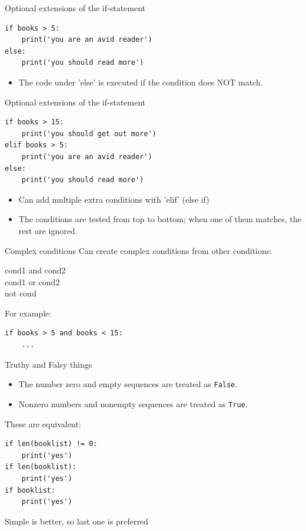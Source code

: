 \documentclass[aspectratio=169,usenames,dvipsnames]{beamer}
\begin{document}
\begin{frame}[fragile]{Optional extensions of the if-statement}
\begin{lstlisting}
if books > 5:
    print('you are an avid reader')
else:
    print('you should read more')
\end{lstlisting}

\begin{itemize}
    \item The code under 'else' is executed if the condition does NOT match.
\end{itemize}
\end{frame}


\begin{frame}[fragile]{Optional extensions of the if-statement}
\begin{lstlisting}
if books > 15:
    print('you should get out more')
elif books > 5:
    print('you are an avid reader')
else:
    print('you should read more')
\end{lstlisting}

\begin{itemize}
    \item Can add multiple extra conditions with 'elif' (else if)
    \item The conditions are tested from top to bottom;
            when one of them matches, the rest are ignored.
\end{itemize}
\end{frame}


\begin{frame}[fragile]{Complex conditions}
    Can create complex conditions from other conditions:
    
    \begin{description}
        \item[cond1 and cond2]
        \item[cond1 or cond2]
        \item[not cond]
    \end{description}

    \pause
    For example:
\begin{lstlisting}
if books > 5 and books < 15:
    ...
\end{lstlisting}

\end{frame}

\begin{frame}[fragile]{Truthy and Falsy things}
\begin{itemize}
    \item The number zero and empty sequences are treated as \texttt{False}.
    \item Nonzero numbers and nonempty sequences are treated as \texttt{True}.
\end{itemize}

These are equivalent:
\begin{lstlisting}
if len(booklist) != 0:
    print('yes')    
if len(booklist):
    print('yes')    
if booklist:
    print('yes')    
\end{lstlisting}

    Simple is better, so last one is preferred
\end{frame}
\end{document}
